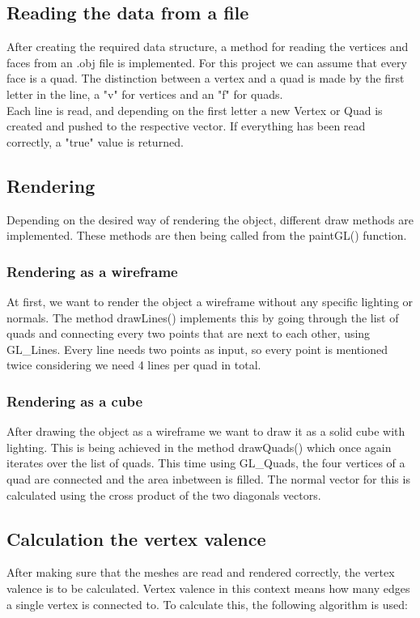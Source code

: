 \documentclass[12pt,a4paper]{scrartcl}
\begin{document}
\subsection{Reading the data from a file}
After creating the required data structure, a method for reading the vertices and faces from an .obj file is implemented. For this project we can assume that every face is a quad. The distinction between a vertex and a quad is made by the first letter in the line, a "v" for vertices and an "f" for quads. \\
Each line is read, and depending on the first letter a new Vertex or Quad is created and pushed to the respective vector.
If everything has been read correctly, a "true" value is returned.

\subsection{Rendering}
Depending on the desired way of rendering the object, different draw methods are implemented. These methods are then being called from the paintGL() function.

\subsubsection{Rendering as a wireframe}
At first, we want to render the object a wireframe without any specific lighting or normals. The method drawLines() implements this by going through the list of quads and connecting every two points that are next to each other, using GL_Lines. Every line needs two points as input, so every point is mentioned twice considering we need 4 lines per quad in total.

\subsubsection{Rendering as a cube}
After drawing the object as a wireframe we want to draw it as a solid cube with lighting. This is being achieved in the method drawQuads() which once again iterates over the list of quads. This time using GL_Quads, the four vertices of a quad are connected and the area inbetween is filled. The normal vector for this is calculated using the cross product of the two diagonals vectors.

\subsection{Calculation the vertex valence}
After making sure that the meshes are read and rendered correctly, the vertex valence is to be calculated. Vertex valence in this context means how many edges a single vertex is connected to. To calculate this, the following algorithm is used:
\end{document}
